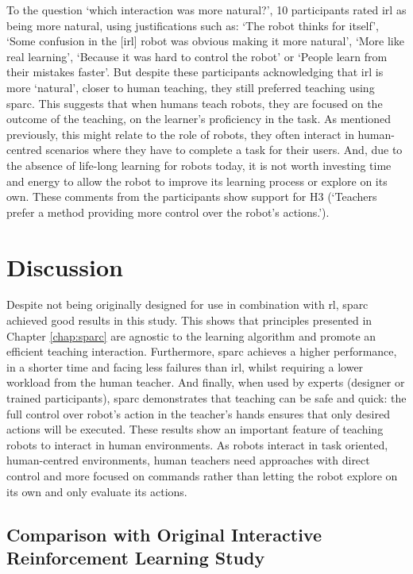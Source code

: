 To the question `which interaction was more natural?', 10 participants rated \gls{irl} as being more natural, using justifications such as: `The robot thinks for itself', `Some confusion in the [\gls{irl}] robot was obvious making it more natural', `More like real learning', `Because it was hard to control the robot' or `People learn from their mistakes faster'. But despite these participants acknowledging that \gls{irl} is more `natural', closer to human teaching, they still preferred teaching using \gls{sparc}. This suggests that when humans teach robots, they are focused on the outcome of the teaching, on the learner's proficiency in the task. As mentioned previously, this might relate to the role of robots, they often interact in human-centred scenarios where they have to complete a task for their users. And, due to the absence of life-long learning for robots today, it is not worth investing time and energy to allow the robot to improve its learning process or explore on its own. These comments from the participants show support for H3 (`Teachers prefer a method providing more control over the robot's actions.').

\section{Discussion}
\label{sec:control_discussion}

Despite not being originally designed for use in combination with \acrlong{rl}, \gls{sparc} achieved good results in this study. This shows that principles presented in Chapter \ref{chap:sparc} are agnostic to the learning algorithm and promote an efficient teaching interaction. Furthermore, \gls{sparc} achieves a higher performance, in a shorter time and facing less failures than \gls{irl}, whilst requiring a lower workload from the human teacher. And finally, when used by experts (designer or trained participants), \gls{sparc} demonstrates that teaching can be safe and quick: the full control over robot's action in the teacher's hands ensures that only desired actions will be executed. These results show an important feature of teaching robots to interact in human environments. As robots interact in task oriented, human-centred environments, human teachers need approaches with direct control and more focused on commands rather than letting the robot explore on its own and only evaluate its actions.

\subsection{Comparison with Original Interactive Reinforcement Learning Study}

